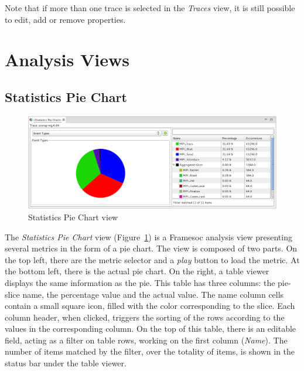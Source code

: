 \documentclass[twoside]{article}
\begin{document}
\begin{sloppypar}
Note that if more than one trace is selected in the \emph{Traces} view, it is still possible to edit, add or remove properties.

\section{Analysis Views}
\label{sec:analysis}

\subsection{Statistics Pie Chart}
\label{subsec:pie}


\begin{figure}[h!]
  \centering
    \includegraphics[width=1.0\textwidth]{images/pie_chart.png}
  \caption{Statistics Pie Chart view}
  \label{fig:pie_chart}
\end{figure}

The \emph{Statistics Pie Chart} view (Figure~\ref{fig:pie_chart}) is a Framesoc analysis view presenting several metrics in the form of a pie chart.
The view is composed of two parts.
On the top left, there are the metric selector and a \emph{play} button to load the metric. 
At the bottom left, there is the actual pie chart.
On the right, a table viewer displays the same information as the pie. 
This table has three columns: the pie-slice name, the percentage value and the actual value. 
The name column cells contain a small square icon, filled with the color corresponding to the slice.
Each column header, when clicked, triggers the sorting of the rows according to the values in the corresponding column.
On the top of this table, there is an editable field, acting as a filter on table rows, working on the first column (\emph{Name}).
The number of items matched by the filter, over the totality of items, is shown in the status bar under the table viewer.


\end{sloppypar}
\end{document}

